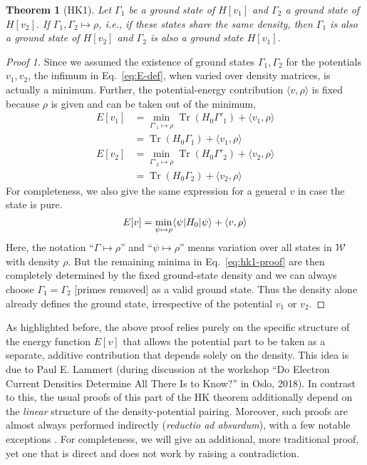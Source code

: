 \documentclass[journal=apcach,manuscript=article,layout=twocolumn]{achemso}
\newtheorem{theorem}{Theorem}
\newcommand{\psispace}{\mathcal{W}}
\DeclareMathOperator{\trace}{Tr}
\newcommand{\changed}[1] {{ {#1}}} %
\begin{document}
\begin{theorem}[HK1]
Let $\Gamma_1$ be a ground state of $H[v_1]$ and $\Gamma_2$ a ground state of $H[v_2]$. If $\Gamma_1,\Gamma_2 \mapsto \rho$, i.e., if these states share the same density, then $\Gamma_1$ is also a ground state of $H[v_2]$ and $\Gamma_2$ is also a ground state $H[v_1]$.
\end{theorem}

\begin{proof}[Proof 1]
Since we assumed the existence of ground states $\Gamma_1,\Gamma_2$ for the potentials $v_1,v_2$, the infimum in Eq.~\eqref{eq:E-def}, when varied over density matrices, is actually a minimum.
Further, the potential-energy contribution $\langle v,\rho \rangle$ is fixed because $\rho$ is given and can be taken out of the minimum,
\begin{subequations}\label{eq:hk1-proof}
\begin{align}
    E[v_1] &= \min_{\Gamma'_1 \mapsto \rho} \trace(H_0 \Gamma'_1 )  + \langle v_1,\rho \rangle \nonumber\\
    & = \trace(H_0 \Gamma_1 )  + \langle v_1,\rho \rangle\\
    E[v_2] &= \min_{\Gamma'_2 \mapsto \rho} \trace(H_0 \Gamma'_2 )  + \langle v_2,\rho \rangle  \nonumber\\
    & = \trace(H_0 \Gamma_2 )  + \langle v_2,\rho \rangle
\end{align}
\end{subequations}
For completeness, we also give the same expression for a general $v$ in case the state is pure.
\begin{equation}\label{eq:hk1}
    E[v] = \min_{\psi \mapsto \rho} \langle \psi |H_0 | \psi \rangle  + \langle v,\rho \rangle \\
\end{equation}
Here, the notation ``$\Gamma \mapsto \rho$'' and ``$\psi \mapsto \rho$'' means variation over all states in $\psispace$ with density $\rho$. But the remaining minima in Eq.~\eqref{eq:hk1-proof} are then completely determined by the fixed ground-state density and we can always choose $\Gamma_1=\Gamma_2$ \changed{[primes removed]} as a valid ground state. Thus the density alone already defines the ground state, irrespective of the potential $v_1$ or $v_2$.
\end{proof}

As highlighted before, the above proof relies purely on the specific structure of the energy function $E[v]$ that allows the potential part to be taken as a separate, additive contribution that depends solely on the density. This idea is due to Paul E. Lammert (during discussion at the workshop ``Do Electron Current Densities Determine All There Is to Know?'' in Oslo, 2018). In contrast to this, the usual proofs of this part of the HK theorem additionally depend on the \emph{linear} structure of the density-potential pairing. Moreover, such proofs are almost always performed indirectly (\textit{reductio ad absurdum}), with a few notable exceptions  \cite{pino2007HK,Garrigue2018}. For completeness, we will give an additional, more traditional proof, yet one that is direct and does not work by raising a contradiction.
\end{document}
